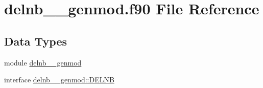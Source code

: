 \hypertarget{delnb____genmod_8f90}{\section{delnb\+\_\+\+\_\+genmod.\+f90 File Reference}
\label{delnb____genmod_8f90}
}
\subsection*{Data Types}
\begin{DoxyCompactItemize}
\item 
module \hyperlink{classdelnb____genmod}{delnb\+\_\+\+\_\+genmod}
\item 
interface \hyperlink{interfacedelnb____genmod_1_1DELNB}{delnb\+\_\+\+\_\+genmod\+::\+D\+E\+L\+N\+B}
\end{DoxyCompactItemize}
